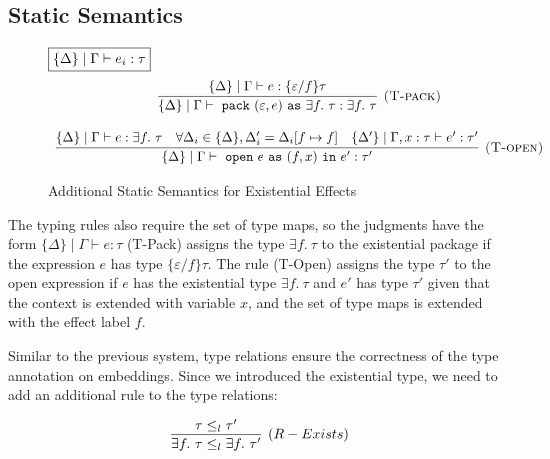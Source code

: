 \subsection{Static Semantics}
\begin{figure}[t]
\footnotesize{
\noindent$\fbox{$\{\Delta\} \mid \Gamma  \vdash e_i : \tau$}$
\[
\begin{array}{c}

\infer[\textsc{(T-pack)}]
  {\{\Delta\}\mid \Gamma \vdash \m{pack} (\varepsilon, e) \m{as} \exists f.\ \tau : \exists f.\ \tau}
  {\{\Delta\}\mid \Gamma \vdash e : \{\varepsilon / f\} \tau} \\[3ex]
  
\infer[\textsc{(T-open)}]
  {\{\Delta\}\mid \Gamma \vdash \m{open} e \m{as} (f, x) \m{in} e' : \tau'}
  {\{\Delta\}\mid \Gamma \vdash e : \exists f.\ \tau & \forall \Delta_i \in \{\Delta\}, \Delta'_i = \Delta_i[f\mapsto f] & \{\Delta'\}\mid \Gamma, x:\tau \vdash e' : \tau'}

\end{array}
\]
\caption{Additional Static Semantics for Existential Effects}
\label{static-addi}
}
\end{figure}

The typing rules also require the set of type maps, so the judgments have the form $\{\Delta\} \mid \Gamma \vdash e : \tau$
(T-Pack) assigns the type $\exists f.\ \tau$ to the existential package if the expression $e$ has type $\{\varepsilon/f\}\tau$. The rule (T-Open) assigns the type $\tau'$ to the open expression if $e$ has the existential type $\exists f.\ \tau$ and $e'$ has type $\tau'$ given that the context is extended with variable $x$, and the set of type maps is extended with the effect label $f$. 

Similar to the previous system, type relations ensure the correctness of the type annotation on embeddings. Since we introduced the existential type, we need to add an additional rule to the type relations:

$$\infer[(R-Exists)]{\exists f.\ \tau \leq_l \exists f.\ \tau'}{\tau \leq_l \tau'}$$


